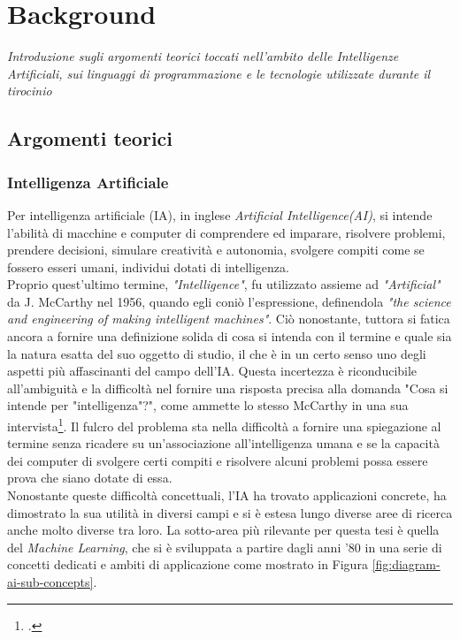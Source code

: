 \chapter{Background}
\label{chap:background}

\textit{Introduzione sugli argomenti teorici toccati nell'ambito delle Intelligenze Artificiali, sui linguaggi di programmazione e le tecnologie utilizzate durante il tirocinio}

\section{Argomenti teorici}


\subsection{Intelligenza Artificiale}

Per intelligenza artificiale (IA), in inglese \textit{Artificial Intelligence(AI)}, si intende l'abilità di macchine e computer di comprendere ed imparare, risolvere problemi, prendere decisioni, simulare creatività e autonomia, svolgere compiti come se fossero esseri umani, individui dotati di intelligenza. \\
Proprio quest'ultimo termine, \textit{"Intelligence"}, fu utilizzato assieme ad \textit{"Artificial"} da J. McCarthy nel 1956, quando egli coniò l'espressione, definendola \textit{"the science and engineering of making intelligent machines"}. 
Ciò nonostante, tuttora si fatica ancora a fornire una definizione solida di cosa si intenda con il termine e quale sia la natura esatta del suo oggetto di studio, il che è in un certo senso uno degli aspetti più affascinanti del campo dell'IA. Questa incertezza è riconducibile all'ambiguità e la difficoltà nel fornire una risposta precisa alla domanda "Cosa si intende per "intelligenza"?", come ammette lo stesso McCarthy in una sua intervista\footcite{article:what-is-ai}. Il fulcro del problema sta nella difficoltà a fornire una spiegazione al termine senza ricadere su un'associazione all'intelligenza umana e se la capacità dei computer di svolgere certi compiti e risolvere alcuni problemi possa essere prova che siano dotate di essa. \\

Nonostante queste difficoltà concettuali, l'IA ha trovato applicazioni concrete, ha dimostrato la sua utilità in diversi campi e si è estesa lungo diverse aree di ricerca anche molto diverse tra loro.
La sotto-area più rilevante per questa tesi è quella del \textit{Machine Learning},
che si è sviluppata a partire dagli anni '80 in una serie di concetti dedicati 
e ambiti di applicazione come mostrato in Figura \ref{fig:diagram-ai-sub-concepts}.

